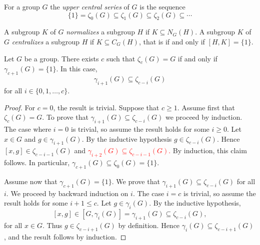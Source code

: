 For a group $G$ the {\em upper central series} of $G$ is the sequence 
\[
	\{1\}=\zeta_0(G)\subseteq\zeta_1(G)\subseteq\zeta_2(G)\subseteq\cdots
\]


A subgroup $K$ of $G$ {\em normalizes} a subgroup 
$H$ if $K\subseteq N_G(H)$.
A subgroup $K$ of $G$ {\em centralizes} a subgroup 
$H$ if $K\subseteq C_G(H)$, that is if and only if $[H,K]=\{1\}$.

\begin{lemma}
	\label{lem:gamma_zeta}
	Let $G$ be a group. There exists $c$ such that $\zeta_c(G)=G$ if and only if 
	$\gamma_{c+1}(G)=\{1\}$. In this case,  
	\[
	\gamma_{i+1}(G)\subseteq\zeta_{c-i}(G)
	\]
	for all $i\in\{0,1,\dots,c\}$. 
\end{lemma}

\begin{proof}
    For $c=0$, the result is trivial. Suppose that $c\geq 1$.
	Assume first that $\zeta_c(G)=G$. To prove that 
    $\gamma_{i+1}(G)\subseteq\zeta_{c-i}(G)$ we proceed by induction. The case where $i=0$ is
	trivial, so assume the result holds for some $i\geq0$. 
	Let $x\in G$ and $g\in \gamma_{i+1}(G)$. By the inductive hypothesis $g\in \zeta_{c-i}(G)$. 
	Hence $[x,g]\in \zeta_{c-i-1}(G)$ and \textcolor{red}{$\gamma_{i+2}(G)\subseteq \zeta_{c-i-1}(G)$.}
	By induction, this claim follows. In particular, $\gamma_{c+1}(G)\subseteq \zeta_{0}(G)=\{ 1\}$.
	
	Assume now that $\gamma_{c+1}(G)=\{1\}$. We prove that 
	$\gamma_{i+1}(G)\subseteq\zeta_{c-i}(G)$ for all $i$. We proceed by backward induction on $i$. 
	The case $i=c$ is trivial, so assume the
	result holds for some $i+1\leq c$. Let $g\in\gamma_{i}(G)$. By the inductive hypothesis, 
	\[
	[x,g]\in [G,\gamma_i(G)]=\gamma_{i+1}(G)\subseteq\zeta_{c-i}(G),
	\]
	for all $x\in G$.
	Thus $g\in\zeta_{c-i+1}(G)$ by definition. Hence $\gamma_{i}(G)\subseteq\zeta_{c-i+1}(G)$, and the result follows
	by induction. 
\end{proof}


